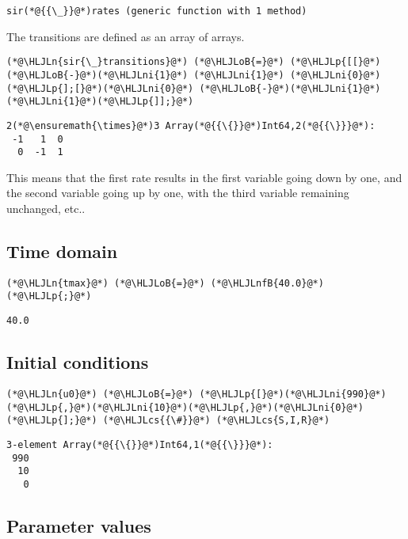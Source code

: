 \documentclass[12pt,a4paper]{article}
\newcommand{\HLJLn}[1]{#1}
\newcommand{\HLJLnfB}[1]{\textcolor[RGB]{59,151,46}{#1}}
\newcommand{\HLJLni}[1]{\textcolor[RGB]{59,151,46}{#1}}
\newcommand{\HLJLoB}[1]{\textcolor[RGB]{102,102,102}{\textbf{#1}}}
\newcommand{\HLJLp}[1]{#1}
\newcommand{\HLJLcs}[1]{\textcolor[RGB]{153,153,119}{\textit{#1}}}
\begin{document}
\begin{lstlisting}
sir(*@{{\_}}@*)rates (generic function with 1 method)
\end{lstlisting}


The transitions are defined as an array of arrays.


\begin{lstlisting}
(*@\HLJLn{sir{\_}transitions}@*) (*@\HLJLoB{=}@*) (*@\HLJLp{[[}@*)(*@\HLJLoB{-}@*)(*@\HLJLni{1}@*) (*@\HLJLni{1}@*) (*@\HLJLni{0}@*)(*@\HLJLp{];[}@*)(*@\HLJLni{0}@*) (*@\HLJLoB{-}@*)(*@\HLJLni{1}@*) (*@\HLJLni{1}@*)(*@\HLJLp{]];}@*)
\end{lstlisting}

\begin{lstlisting}
2(*@\ensuremath{\times}@*)3 Array(*@{{\{}}@*)Int64,2(*@{{\}}}@*):
 -1   1  0
  0  -1  1
\end{lstlisting}


This means that the first rate results in the first variable going down by one, and the second variable going up by one, with the third variable remaining unchanged, etc..

\subsection{Time domain}

\begin{lstlisting}
(*@\HLJLn{tmax}@*) (*@\HLJLoB{=}@*) (*@\HLJLnfB{40.0}@*)(*@\HLJLp{;}@*)
\end{lstlisting}

\begin{lstlisting}
40.0
\end{lstlisting}


\subsection{Initial conditions}

\begin{lstlisting}
(*@\HLJLn{u0}@*) (*@\HLJLoB{=}@*) (*@\HLJLp{[}@*)(*@\HLJLni{990}@*)(*@\HLJLp{,}@*)(*@\HLJLni{10}@*)(*@\HLJLp{,}@*)(*@\HLJLni{0}@*)(*@\HLJLp{];}@*) (*@\HLJLcs{{\#}}@*) (*@\HLJLcs{S,I,R}@*)
\end{lstlisting}

\begin{lstlisting}
3-element Array(*@{{\{}}@*)Int64,1(*@{{\}}}@*):
 990
  10
   0
\end{lstlisting}


\subsection{Parameter values}
\end{document}
